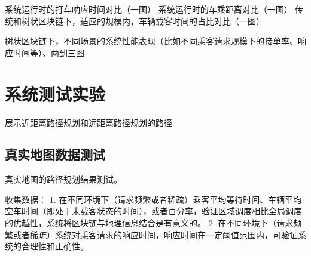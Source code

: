   系统运行时的打车响应时间对比（一图）
  系统运行时的车乘距离对比（一图）
  传统和树状区块链下，适应的规模内，车辆载客时间的占比对比（一图）

  树状区块链下，不同场景的系统性能表现（比如不同乘客请求规模下的接单率、响应时间等）、两到三图









\section{系统测试实验}

展示近距离路径规划和远距离路径规划的路径

\subsection{真实地图数据测试}
真实地图的路径规划结果测试。

收集数据：
1. 在不同环境下（请求频繁或者稀疏）乘客平均等待时间、车辆平均空车时间（即处于未载客状态的时间），或者百分率，验证区域调度相比全局调度的优越性，系统将区块链与地理信息结合是有意义的。
2. 在不同环境下（请求频繁或者稀疏）系统对乘客请求的响应时间，响应时间在一定阈值范围内，可验证系统的合理性和正确性。